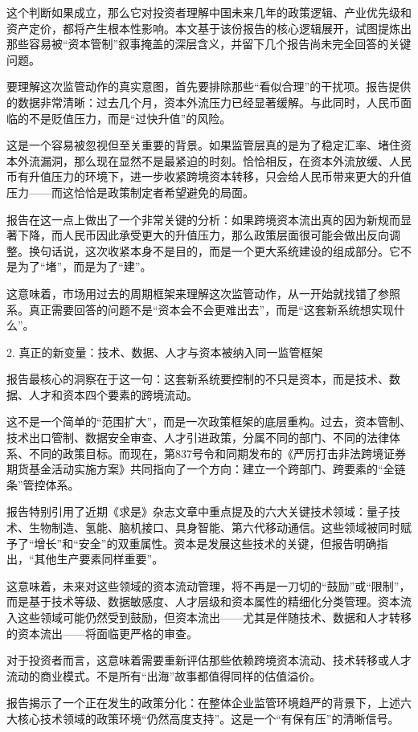 \documentclass[11pt]{ctexart}
\begin{document}
这个判断如果成立，那么它对投资者理解中国未来几年的政策逻辑、产业优先级和资产定价，都将产生根本性影响。本文基于该份报告的核心逻辑展开，试图提炼出那些容易被“资本管制”叙事掩盖的深层含义，并留下几个报告尚未完全回答的关键问题。

要理解这次监管动作的真实意图，首先要排除那些“看似合理”的干扰项。报告提供的数据非常清晰：过去几个月，资本外流压力已经显著缓解。与此同时，人民币面临的不是贬值压力，而是“过快升值”的风险。

这是一个容易被忽视但至关重要的背景。如果监管层真的是为了稳定汇率、堵住资本外流漏洞，那么现在显然不是最紧迫的时刻。恰恰相反，在资本外流放缓、人民币有升值压力的环境下，进一步收紧跨境资本转移，只会给人民币带来更大的升值压力——而这恰恰是政策制定者希望避免的局面。

报告在这一点上做出了一个非常关键的分析：如果跨境资本流出真的因为新规而显著下降，而人民币因此承受更大的升值压力，那么政策层面很可能会做出反向调整。换句话说，这次收紧本身不是目的，而是一个更大系统建设的组成部分。它不是为了“堵”，而是为了“建”。

这意味着，市场用过去的周期框架来理解这次监管动作，从一开始就找错了参照系。真正需要回答的问题不是“资本会不会更难出去”，而是“这套新系统想实现什么”。

2. 真正的新变量：技术、数据、人才与资本被纳入同一监管框架

报告最核心的洞察在于这一句：这套新系统要控制的不只是资本，而是技术、数据、人才和资本四个要素的跨境流动。

这不是一个简单的“范围扩大”，而是一次政策框架的底层重构。过去，资本管制、技术出口管制、数据安全审查、人才引进政策，分属不同的部门、不同的法律体系、不同的政策目标。而现在，第837号令和同期发布的《严厉打击非法跨境证券期货基金活动实施方案》共同指向了一个方向：建立一个跨部门、跨要素的“全链条”管控体系。

报告特别引用了近期《求是》杂志文章中重点提及的六大关键技术领域：量子技术、生物制造、氢能、脑机接口、具身智能、第六代移动通信。这些领域被同时赋予了“增长”和“安全”的双重属性。资本是发展这些技术的关键，但报告明确指出，“其他生产要素同样重要”。

这意味着，未来对这些领域的资本流动管理，将不再是一刀切的“鼓励”或“限制”，而是基于技术等级、数据敏感度、人才层级和资本属性的精细化分类管理。资本流入这些领域可能仍然受到鼓励，但资本流出——尤其是伴随技术、数据和人才转移的资本流出——将面临更严格的审查。

对于投资者而言，这意味着需要重新评估那些依赖跨境资本流动、技术转移或人才流动的商业模式。不是所有“出海”故事都值得同样的估值溢价。

报告揭示了一个正在发生的政策分化：在整体企业监管环境趋严的背景下，上述六大核心技术领域的政策环境“仍然高度支持”。这是一个“有保有压”的清晰信号。
\end{document}
